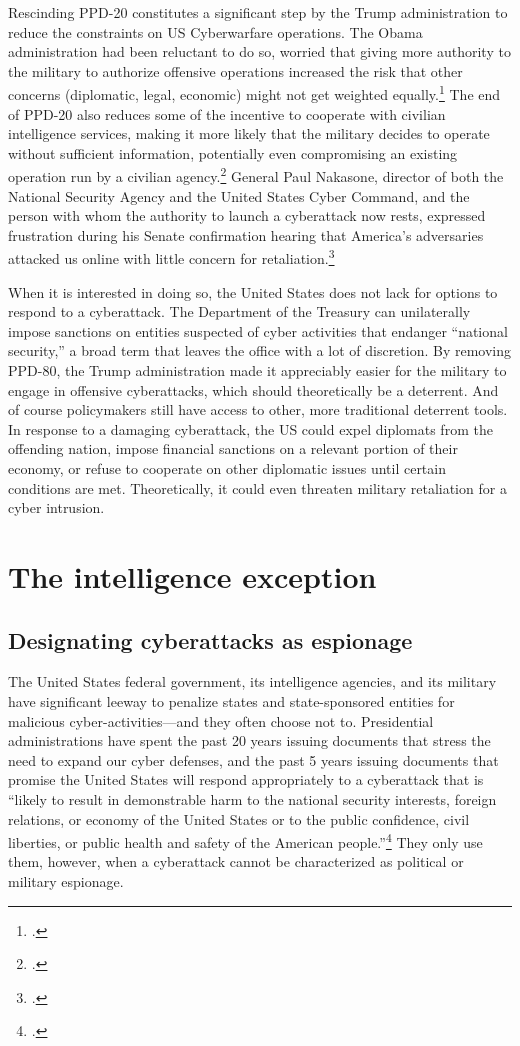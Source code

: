 \documentclass[11pt]{memoir}
\begin{document}
\begin{refsegment}
Rescinding PPD-20 constitutes a significant step by the Trump administration to reduce the constraints on US Cyberwarfare operations. The Obama administration had been reluctant to do so, worried that giving more authority to the military to authorize offensive operations increased the risk that other concerns (diplomatic, legal, economic) might not get weighted equally.\footcite{starks_ramifications_2018} The end of PPD-20 also reduces some of the incentive to cooperate with civilian intelligence services, making it more likely that the military decides to operate without sufficient information, potentially even compromising an existing operation run by a civilian agency.\footcite{hawkins_cybersecurity_2018} General Paul Nakasone, director of both the National Security Agency and the United States Cyber Command, and the person with whom the authority to launch a cyberattack now rests, expressed frustration during his Senate confirmation hearing that America's adversaries attacked us online with little concern for retaliation.\footcite{sanger_trump_2018}

When it is interested in doing so, the United States does not lack for options to respond to a cyberattack. The Department of the Treasury can unilaterally impose sanctions on entities suspected of cyber activities that endanger ``national security,'' a broad term that leaves the office with a lot of discretion. By removing PPD-80, the Trump administration made it appreciably easier for the military to engage in offensive cyberattacks, which should theoretically be a deterrent. And of course policymakers still have access to other, more traditional deterrent tools. In response to a damaging cyberattack, the US could expel diplomats from the offending nation, impose financial sanctions on a relevant portion of their economy, or refuse to cooperate on other diplomatic issues until certain conditions are met. Theoretically, it could even threaten military retaliation for a cyber intrusion.

\section{The intelligence exception}
\subsection{Designating cyberattacks as espionage}
The United States federal government, its intelligence agencies, and its military have significant leeway to penalize states and state-sponsored entities for malicious cyber-activities---and they often choose not to. Presidential administrations have spent the past 20 years issuing documents that stress the need to expand our cyber defenses, and the past 5 years issuing documents that promise the United States will respond appropriately to a cyberattack that is ``likely to result in demonstrable harm to the national security interests, foreign relations, or economy of the United States or to the public confidence, civil liberties, or public health and safety of the American people.''\footcite{office_of_the_press_secretary_fact_2016} They only use them, however, when a cyberattack cannot be characterized as political or military espionage.


\end{refsegment}
\end{document}

